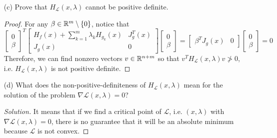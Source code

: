 \documentclass[10pt]{article}
\newcommand{\LL}{\mathcal{L}}
\begin{document}
\begin{itemize}
\item[(c)] Prove that $ H_\LL(x,\lambda) $ cannot be positive definite. 

\begin{proof}
For any $ \beta \in \mathbb{R}^m \setminus \{ 0 \} $, notice that $$
\begin{bmatrix}
0 \\
\beta
\end{bmatrix}^T
\begin{bmatrix}
H_f(x) + \sum_{k = 1}^m \lambda_k H_{g_k}(x) & J^T_{g}(x) \\
J_{g}(x) & 0
\end{bmatrix}
\begin{bmatrix}
0 \\
\beta
\end{bmatrix} =
\begin{bmatrix} \beta^T J_g(x) & 0 \end{bmatrix}  \begin{bmatrix}
0 \\
\beta
\end{bmatrix} = 0
$$ Therefore, we can find nonzero vectors $ v \in \mathbb{R}^{n+m} $ so that $ v^T H_\LL(x,\lambda) v \not > 0 $, i.e. $ H_{\LL}(x,\lambda) $ is not positive definite.
\end{proof}

\item[(d)] What does the non-positive-definiteness of $ H_\LL(x,\lambda) $ mean for the solution of the problem $ \nabla \LL(x,\lambda) = 0 $?

\begin{proof}[Solution] It means that if we find a critical point of $\LL$, i.e. $ (x,\lambda) $ with $ \nabla \LL(x,\lambda) = 0 $, there is no guarantee that it will be an absolute minimum because $ \LL $ is not convex.
\end{proof}

\end{itemize}

\end{document}
